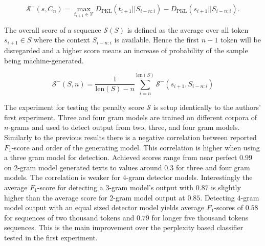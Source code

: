    \begin{equation}
        \mathcal{S}^-(s, C_n) = \max_{t_{i+1} \in \mathcal{V}} D_{\mathrm{PKL}}(t_{i+1} || S_{i-n:i}) - D_{\mathrm{PKL}}(s_{i+1} || S_{i-n:i}) \text{.}
    \end{equation}

    The overall score of a sequence $\mathcal{S}(S)$ is defined as the average over all token $s_{i+1} \in S$ where the context $S_{i-n:i}$ is available.
    Hence the first $n-1$ token will be disregarded and a higher score means an increase of probability of the sample being machine-generated.

    \begin{equation}
        \mathcal{S}^-(S, n) = \frac{1}{\text{len}(S)-n} \sum_{i = n}^{\text{len}(S)} \mathcal{S}^-(s_{i+1}, S_{i-n:i})
    \end{equation}  

    The experiment for testing the penalty score $\mathcal{S}$ is setup identically to the authors' first experiment.
    Three and four gram models are trained on different corpora of $n$-grams and used to detect output from two, three, and four gram models.
    Similarly to the previous results there is a negative correlation between reported $F_1$-score and order of the generating model.
    This correlation is higher when using a three gram model for detection.
    Achieved scores range from near perfect $0.99$ on $2$-gram model generated texts to values around $0.3$ for three and four gram models.
    The correlation is weaker for $4$-gram detector models.
    Interestingly the average $F_1$-score for detecting a $3$-gram model's output with $0.87$ is slightly higher than the average score for $2$-gram model output at $0.85$.
    Detecting $4$-gram model output with an equal sized detector model yields average $F_1$-scores of $0.58$ for sequences of two thousand tokens and $0.79$ for longer five thousand tokens sequences.
    This is the main improvement over the perplexity based classifier tested in the first experiment.

